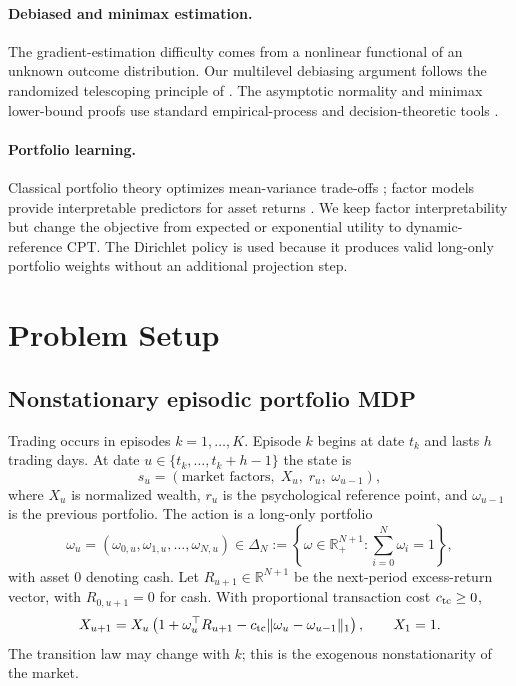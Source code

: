 \documentclass[11pt]{article}
\newcommand{\R}{\mathbb R}
\newcommand{\1}{\mathbf 1}
\DeclarePairedDelimiter{\norm}{\lVert}{\rVert}
\newcommand{\CPT}{\ensuremath{\mathrm{CPT}}\xspace}
\begin{document}
\paragraph{Debiased and minimax estimation.}
The gradient-estimation difficulty comes from a nonlinear functional of an unknown outcome distribution.  Our multilevel debiasing argument follows the randomized telescoping principle of \citet{rhee2015unbiased}.  The asymptotic normality and minimax lower-bound proofs use standard empirical-process and decision-theoretic tools \citep{vandervaart1998asymptotic,tsybakov2009introduction}.

\paragraph{Portfolio learning.}
Classical portfolio theory optimizes mean-variance trade-offs \citep{markowitz1952portfolio}; factor models provide interpretable predictors for asset returns \citep{fama1993common}.  We keep factor interpretability but change the objective from expected or exponential utility to dynamic-reference \CPT.  The Dirichlet policy is used because it produces valid long-only portfolio weights without an additional projection step.

\section{Problem Setup}\label{sec:setup}

\subsection{Nonstationary episodic portfolio MDP}

Trading occurs in episodes $k=1,\ldots,K$.  Episode $k$ begins at date $t_k$ and lasts $h$ trading days.  At date $u\in\{t_k,\ldots,t_k+h-1\}$ the state is
\[
 s_u=(\text{market factors},\;X_u,\;r_u,\;\omega_{u-1}),
\]
where $X_u$ is normalized wealth, $r_u$ is the psychological reference point, and $\omega_{u-1}$ is the previous portfolio.  The action is a long-only portfolio
\[
 \omega_u=(\omega_{0,u},\omega_{1,u},\ldots,\omega_{N,u})\in \Delta_N
 :=\left\{\omega\in\R_+^{N+1}:\sum_{i=0}^{N}\omega_i=1\right\},
\]
with asset $0$ denoting cash.  Let $R_{u+1}\in\R^{N+1}$ be the next-period excess-return vector, with $R_{0,u+1}=0$ for cash.  With proportional transaction cost $c_{\rm tc}\ge0$,
\begin{equation}\label{eq:wealth-update}
 X_{u+1}=X_u\left(1+\omega_u^\top R_{u+1}-c_{\rm tc}\norm{\omega_u-\omega_{u-1}}_1\right),
 \qquad X_1=1.
\end{equation}
The transition law may change with $k$; this is the exogenous nonstationarity of the market.
\end{document}
